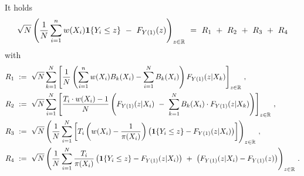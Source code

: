 \pagebreak
\begin{lemma}
  \label{aa:mean:lemma_decomp}
  It holds
  \begin{gather}
  \sqrt{N}
\left( 
    \frac{1}{N}
    \sum_{i=1}^{n} 
    w(X_i)
    \mathbf{1}{\left\{ Y_i \le z \right\}}
    \ 
    -
    \ 
    F_{Y(1)}(z)
    \right)
    _{z\in\R}
    \ 
    =
    \ 
    R_1
    \ 
    +
    \ 
    R_2
    \ 
    +
    \ 
    R_3
    \ 
    +
    \ 
    R_4
  \end{gather}
  with
\begin{align*}
  R_1
  &
  \ 
  :=
  \ 
  \sqrt{N}
  \sum_{k=1}^{N} 
  \left[ 
  \frac{1}{N}
  \left( 
    \sum_{i=1}^{n} 
    w(X_i)
    B_k(X_i)
    -
    \sum_{i=1}^{N} 
    B_k(X_i)
  \right)
  F_{Y(1)}(z|X_k)
  \right]
  _{z\in\R}
  \,,
  \\
  R_2
  &
  \
  :=
  \ 
  \sqrt{N}
    \sum_{i=1}^{N} 
    \left[ 
  \frac{
    T_i\cdot w(X_i) -1 }{N}
    \left( 
  F_{Y(1)}(z|X_i)
    \ 
    -
    \ 
    \sum_{k=1}^{N} 
    B_k(X_i)
    \cdot
  F_{Y(1)}(z|X_k)
    \right)
    \right]
  _{z\in\R}
  \,,
  \\
  R_3
  &
  \
  :=
  \ 
  \sqrt{N}
  \left( 
  \frac{1}{N}
    \sum_{i=1}^{N} 
    \left[ 
    T_i
    \left( 
    w(X_i) 
    -
    \frac{1}{\pi(X_i)}
    \right)
    \left( 
    \mathbf{1}{\left\{ Y_i \le z \right\}}
    -
  F_{Y(1)}(z|X_i)
    \right)
    \right]
  \right)
  _{z\in\R}
  \,,
  \\
  R_4
  &
  \
  :=
  \ 
  \sqrt{N}
  \left( 
  \frac{1}{N}
    \sum_{i=1}^{N} 
    \frac{T_i}{\pi(X_i)}
    \left( 
    \mathbf{1}{\left\{ Y_i \le z \right\}}
    -
  F_{Y(1)}(z|X_i)
    \right)
    \ 
    +
    \ 
    \left( 
  F_{Y(1)}(z|X_i)
    -
  F_{Y(1)}(z)
    \right)
  \right)
  _{z\in\R}
  \,.
  \end{align*}
\end{lemma}
\nopagebreak

